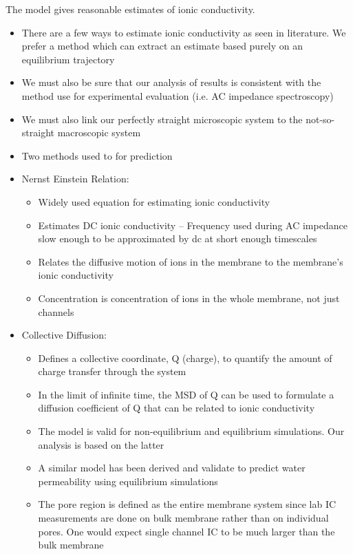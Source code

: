 \documentclass{article}
\begin{document}
	The model gives reasonable estimates of ionic conductivity.
	\begin{itemize}
		\item There are a few ways to estimate ionic conductivity as seen in literature. We prefer a method which can extract an estimate based purely on an equilibrium trajectory
		\item We must also be sure that our analysis of results is consistent with the method use for experimental evaluation (i.e. AC impedance spectroscopy)
		\item We must also link our perfectly straight microscopic system to the not-so-straight macroscopic system
		\item Two methods used to for prediction
		\item Nernst Einstein Relation:
		\begin{itemize}
			\item Widely used equation for estimating ionic conductivity
			\item Estimates DC ionic conductivity -- Frequency used during AC impedance slow enough to be approximated by dc at short enough timescales
			\item Relates the diffusive motion of ions in the membrane to the membrane's ionic conductivity
			\item Concentration is concentration of ions in the whole membrane, not just channels
		\end{itemize}
		\item Collective Diffusion:
		\begin{itemize}
			\item Defines a collective coordinate, Q (charge), to quantify the amount of charge transfer through the system
			\item In the limit of infinite time, the MSD of Q can be used to formulate a diffusion coefficient of Q that can be related to ionic conductivity
			\item The model is valid for non-equilibrium and equilibrium simulations. Our analysis is based on the latter
			\item A similar model has been derived and validate to predict water permeability using equilibrium simulations
			\item The pore region is defined as the entire membrane system since lab IC measurements are done on bulk membrane rather than on individual pores. One would expect single channel IC to be much larger than the bulk membrane
		\end{itemize}                    
	\end{itemize}
\end{document}
